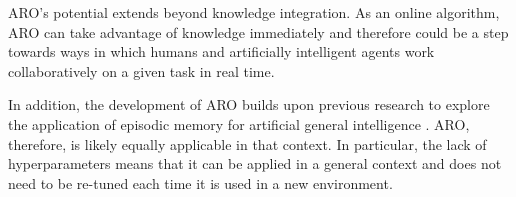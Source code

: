 \documentclass[letterpaper]{article} %
\begin{document}
ARO's potential extends beyond knowledge integration.  As an online
algorithm, ARO can take advantage of knowledge immediately and
therefore could be a step towards ways in which humans and artificially
intelligent agents work collaboratively on a given task in real time.

In addition, the development of ARO builds upon previous research to
explore the application of episodic memory for artificial general
intelligence \cite{Rodriguez17}.  ARO, therefore, is likely equally
applicable in that context.  In particular, the lack of
hyperparameters means that it can be applied in a general context and
does not need to be re-tuned each time it is used in a new
environment.



\begin{quote}
\begin{small}


\end{small}
\end{quote}
\end{document}
